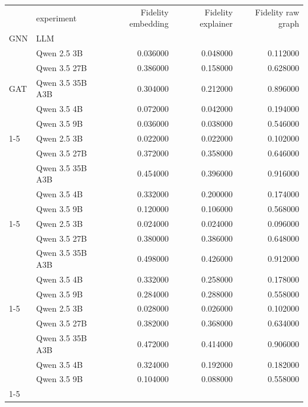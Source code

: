\begin{tabular}{llrrr}
\toprule
 & experiment & Fidelity embedding & Fidelity explainer & Fidelity raw graph \\
GNN & LLM &  &  &  \\
\midrule
\multirow[t]{5}{*}{GAT} & Qwen 2.5 3B & 0.036000 & 0.048000 & 0.112000 \\
 & Qwen 3.5 27B & 0.386000 & 0.158000 & 0.628000 \\
 & Qwen 3.5 35B A3B & 0.304000 & 0.212000 & 0.896000 \\
 & Qwen 3.5 4B & 0.072000 & 0.042000 & 0.194000 \\
 & Qwen 3.5 9B & 0.036000 & 0.038000 & 0.546000 \\
\cline{1-5}
\multirow[t]{5}{*}{GCN} & Qwen 2.5 3B & 0.022000 & 0.022000 & 0.102000 \\
 & Qwen 3.5 27B & 0.372000 & 0.358000 & 0.646000 \\
 & Qwen 3.5 35B A3B & 0.454000 & 0.396000 & 0.916000 \\
 & Qwen 3.5 4B & 0.332000 & 0.200000 & 0.174000 \\
 & Qwen 3.5 9B & 0.120000 & 0.106000 & 0.568000 \\
\cline{1-5}
\multirow[t]{5}{*}{GIN} & Qwen 2.5 3B & 0.024000 & 0.024000 & 0.096000 \\
 & Qwen 3.5 27B & 0.380000 & 0.386000 & 0.648000 \\
 & Qwen 3.5 35B A3B & 0.498000 & 0.426000 & 0.912000 \\
 & Qwen 3.5 4B & 0.332000 & 0.258000 & 0.178000 \\
 & Qwen 3.5 9B & 0.284000 & 0.288000 & 0.558000 \\
\cline{1-5}
\multirow[t]{5}{*}{GraphSAGE} & Qwen 2.5 3B & 0.028000 & 0.026000 & 0.102000 \\
 & Qwen 3.5 27B & 0.382000 & 0.368000 & 0.634000 \\
 & Qwen 3.5 35B A3B & 0.472000 & 0.414000 & 0.906000 \\
 & Qwen 3.5 4B & 0.324000 & 0.192000 & 0.182000 \\
 & Qwen 3.5 9B & 0.104000 & 0.088000 & 0.558000 \\
\cline{1-5}
\bottomrule
\end{tabular}
